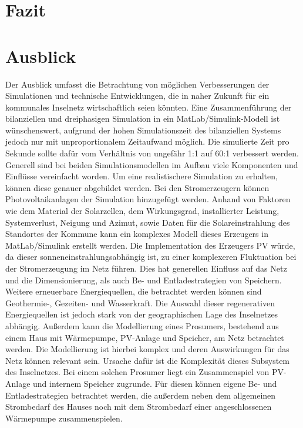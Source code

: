 \chapter{Fazit}

\chapter{Ausblick}

Der Ausblick umfasst die Betrachtung von möglichen Verbesserungen der Simulationen und technische Entwicklungen, die in naher Zukunft für ein kommunales Inselnetz wirtschaftlich seien könnten.
Eine Zusammenführung der bilanziellen und dreiphasigen Simulation in ein MatLab/Simulink-Modell ist wünschenswert, aufgrund der hohen Simulationszeit des bilanziellen Systems jedoch nur mit unproportionalem Zeitaufwand möglich.
Die simulierte Zeit pro Sekunde sollte dafür vom Verhältnis von ungefähr 1:1 auf 60:1 verbessert werden.
Generell sind bei beiden Simulationsmodellen im Aufbau viele Komponenten und Einflüsse vereinfacht worden. 
Um eine realistischere Simulation zu erhalten, können diese genauer abgebildet werden.
Bei den Stromerzeugern können Photovoltaikanlagen der Simulation hinzugefügt werden.
Anhand von Faktoren wie dem Material der Solarzellen, dem Wirkungsgrad, installierter Leistung, Systemverlust, Neigung und Azimut, sowie Daten für die Solareinstrahlung des Standortes der Kommune kann ein komplexes Modell dieses Erzeugers in MatLab/Simulink erstellt werden\cite{jrcpv}.
Die Implementation des Erzeugers PV würde, da dieser sonneneinstrahlungsabhängig ist, zu einer komplexeren Fluktuation bei der Stromerzeugung im Netz führen. 
Dies hat generellen Einfluss auf das Netz und die Dimensionierung, als auch Be- und Entladestrategien von Speichern.
Weitere erneuerbare Energiequellen, die betrachtet werden können sind Geothermie-, Gezeiten- und Wasserkraft.
Die Auswahl dieser regenerativen Energiequellen ist jedoch stark von der geographischen Lage des Inselnetzes abhängig.
Außerdem kann die Modellierung eines Prosumers, bestehend aus einem Haus mit Wärmepumpe, PV-Anlage und Speicher, am Netz betrachtet werden.
Die Modellierung ist hierbei komplex und deren Auswirkungen für das Netz können relevant sein.
Ursache dafür ist die Komplexität dieses Subsystem des Inselnetzes.
Bei einem solchen Prosumer liegt ein Zusammenspiel von PV-Anlage und internem Speicher zugrunde.
Für diesen können eigene Be- und Entladestrategien betrachtet werden, die außerdem neben dem allgemeinen Strombedarf des Hauses noch mit dem Strombedarf einer angeschlossenen Wärmepumpe zusammenspielen.
